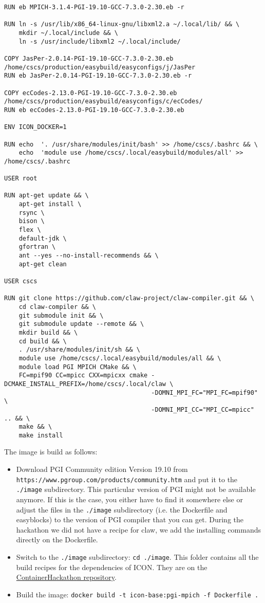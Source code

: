 \documentclass{article}
\begin{document}
\begin{verbatim}
RUN eb MPICH-3.1.4-PGI-19.10-GCC-7.3.0-2.30.eb -r

RUN ln -s /usr/lib/x86_64-linux-gnu/libxml2.a ~/.local/lib/ && \
    mkdir ~/.local/include && \
    ln -s /usr/include/libxml2 ~/.local/include/

COPY JasPer-2.0.14-PGI-19.10-GCC-7.3.0-2.30.eb /home/cscs/production/easybuild/easyconfigs/j/JasPer
RUN eb JasPer-2.0.14-PGI-19.10-GCC-7.3.0-2.30.eb -r

COPY ecCodes-2.13.0-PGI-19.10-GCC-7.3.0-2.30.eb /home/cscs/production/easybuild/easyconfigs/c/ecCodes/
RUN eb ecCodes-2.13.0-PGI-19.10-GCC-7.3.0-2.30.eb

ENV ICON_DOCKER=1

RUN echo  '. /usr/share/modules/init/bash' >> /home/cscs/.bashrc && \
    echo  'module use /home/cscs/.local/easybuild/modules/all' >> /home/cscs/.bashrc    
    
USER root

RUN apt-get update && \
    apt-get install \
    rsync \
    bison \
    flex \
    default-jdk \
    gfortran \
    ant --yes --no-install-recommends && \
    apt-get clean

USER cscs

RUN git clone https://github.com/claw-project/claw-compiler.git && \
    cd claw-compiler && \
    git submodule init && \
    git submodule update --remote && \
    mkdir build && \
    cd build && \
    . /usr/share/modules/init/sh && \
    module use /home/cscs/.local/easybuild/modules/all && \
    module load PGI MPICH CMake && \
    FC=mpif90 CC=mpicc CXX=mpicxx cmake -DCMAKE_INSTALL_PREFIX=/home/cscs/.local/claw \ 
                                        -DOMNI_MPI_FC="MPI_FC=mpif90" \ 
                                        -DOMNI_MPI_CC="MPI_CC=mpicc" .. && \
    make && \
    make install
\end{verbatim}
\normalsize

The image is build as follows:

\begin{itemize}
 \item   Download PGI Community edition Version 19.10 from \verb$https://www.pgroup.com/products/community.htm$ and put it to the \verb$./image$ subdirectory. This particular version of PGI might not be available anymore. If this is the case, you either have to find it somewhere else or adjust the files in the \verb$./image$ subdirectory (i.e. the Dockerfile and easyblocks) to the version of PGI compiler that you can get. During the hackathon we did not have
 a recipe for claw, we add the installing commands directly on the Dockerfile.
 
 \item   Switch to the \verb$./image$ subdirectory: \verb$cd ./image$. This folder contains all the build recipes for the dependencies
 of ICON. They are on the \href{https://github.com/eth-cscs/ContainerHackathon/tree/master/ICON/image}{ContainerHackathon repository}.
 
 \item   Build the image: \verb$docker build -t icon-base:pgi-mpich -f Dockerfile .$
 
\end{itemize}
\end{document}
